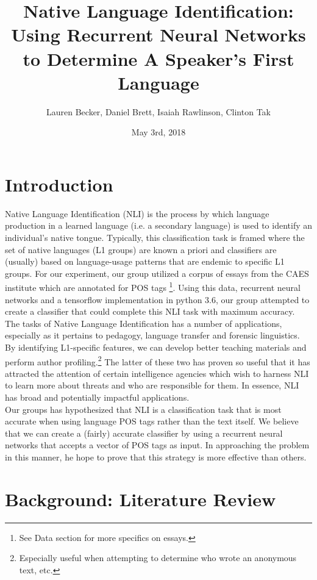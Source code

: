 \documentclass[12pt]{article}
\title{Native Language Identification: Using Recurrent Neural Networks to Determine A Speaker's First Language}
\author{Lauren Becker, Daniel Brett, Isaiah Rawlinson, Clinton Tak}
\date{May 3rd, 2018}
\newcommand\tab[1][1cm]{\hspace*{#1}}
\begin{document}
	\maketitle
\tableofcontents
\newpage
\section{Introduction}
\tab Native Language Identification (NLI) is the process by which language production in a learned language (i.e. a secondary language) is used to identify an individual's native tongue. Typically, this classification task is framed where the set of native languages (L1 groups) are known a priori and classifiers are (usually) based on language-usage patterns that are endemic to specific L1 groups. For our experiment, our group utilized a corpus of essays from the CAES institute which are annotated for POS tags \footnote{See Data section for more specifics on essays.}. Using this data, recurrent neural networks and a tensorflow implementation in python 3.6, our group attempted to create a classifier that could complete this NLI task with maximum accuracy.\\
\tab The tasks of Native Language Identification has a number of applications, especially as it pertains to pedagogy, language transfer and forensic linguistics. By identifying L1-specific features, we can develop better teaching materials and perform author profiling.\footnote{Especially useful when attempting to determine who wrote an anonymous text, etc.} The latter of these two has proven so useful that it has attracted the attention of certain intelligence agencies which wish to harness NLI to learn more about threats and who are responsible for them. In essence, NLI has broad and potentially impactful applications.\\
\tab Our groups has hypothesized that NLI is a classification task that is most accurate when using language POS tags rather than the text itself. We believe that we can create a (fairly) accurate classifier by using a recurrent neural networks that accepts a vector of POS tags as input. In approaching the problem in this manner, he hope to prove that this strategy is more effective than others.
\section{Background: Literature Review}
\end{document}
